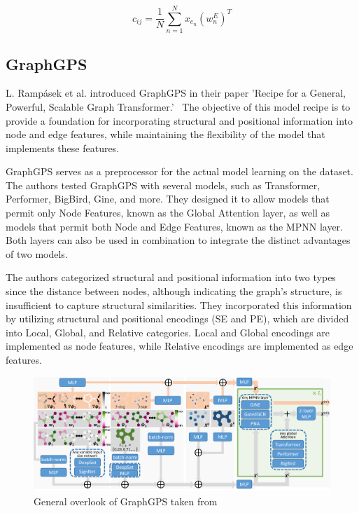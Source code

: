 \begin{equation}
    c_{ij} = \frac{1}{N} \sum_{n=1}^{N} x_{e_n}(w_n^E)^T
    \label{eqn:bias_2}
\end{equation}

\subsection{GraphGPS}
\label{sec:graphgps}
L. Rampásek et al. introduced GraphGPS in their paper 'Recipe for a General, Powerful, Scalable Graph Transformer.'~\cite{2023graphgps} The objective of this model recipe is to provide a foundation for incorporating structural and positional information into node and edge features, while maintaining the flexibility of the model that implements these features.

GraphGPS serves as a preprocessor for the actual model learning on the dataset. The authors tested GraphGPS with several models, such as Transformer, Performer, BigBird, Gine, and more. They designed it to allow models that permit only Node Features, known as the Global Attention layer, as well as models that permit both Node and Edge Features, known as the MPNN layer. Both layers can also be used in combination to integrate the distinct advantages of two models.

The authors categorized structural and positional information into two types since the distance between nodes, although indicating the graph's structure, is insufficient to capture structural similarities. They incorporated this information by utilizing structural and positional encodings (SE and PE), which are divided into Local, Global, and Relative categories. Local and Global encodings are implemented as node features, while Relative encodings are implemented as edge features.

\begin{figure}[ht!]
    \centering
    \includegraphics[scale=0.13]{tex/res/gps_abstract.png}
    \caption{General overlook of GraphGPS taken from~\cite{2023graphgps}}
    \label{fig:gps-abstract}
\end{figure}


